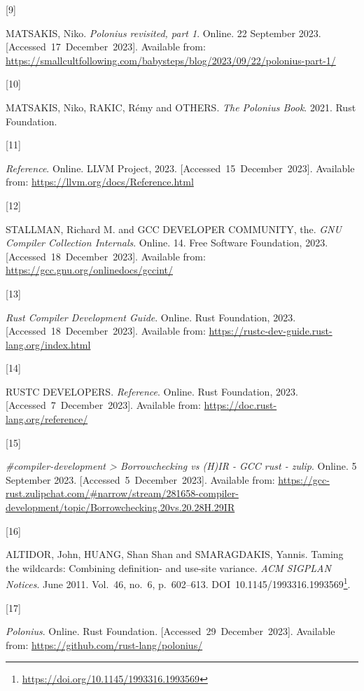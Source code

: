 \documentclass[
  11pt,
  twoside]{report}
\newlength{\cslhangindent}
\newlength{\csllabelwidth}
\newenvironment{CSLReferences}[2] %
 {\begin{list}{}{%
  \setlength{\itemindent}{0pt}
  \setlength{\leftmargin}{0pt}
  \setlength{\parsep}{0pt}
  \ifodd #1
   \setlength{\leftmargin}{\cslhangindent}
   \setlength{\itemindent}{-1\cslhangindent}
  \fi
  \setlength{\itemsep}{#2\baselineskip}}}
 {\end{list}}
\newcommand{\CSLLeftMargin}[1]{\parbox[t]{\csllabelwidth}{\strut#1\strut}}
\newcommand{\CSLRightInline}[1]{\parbox[t]{\linewidth - \csllabelwidth}{\strut#1\strut}}
\DeclareRobustCommand{\href}[2]{#2\footnote{\url{#1}}}
\begin{document}
\begin{CSLReferences}{0}{1}
\CSLLeftMargin{{[}9{]} }%
\CSLRightInline{MATSAKIS, Niko. \emph{Polonius revisited, part 1}.
Online. 22 September 2023. {[}Accessed~17~December~2023{]}. Available
from:
\url{https://smallcultfollowing.com/babysteps/blog/2023/09/22/polonius-part-1/}}

\CSLLeftMargin{{[}10{]} }%
\CSLRightInline{MATSAKIS, Niko, RAKIC, Rémy and OTHERS. \emph{{T}he
{P}olonius {B}ook}. 2021. Rust Foundation. }

\CSLLeftMargin{{[}11{]} }%
\CSLRightInline{\emph{Reference}. Online. LLVM Project, 2023.
{[}Accessed~15~December~2023{]}. Available from:
\url{https://llvm.org/docs/Reference.html}}

\CSLLeftMargin{{[}12{]} }%
\CSLRightInline{STALLMAN, Richard M. and GCC DEVELOPER COMMUNITY, the.
\emph{{GNU} {C}ompiler {C}ollection {I}nternals}. Online. 14. Free
Software Foundation, 2023. {[}Accessed~18~December~2023{]}. Available
from: \url{https://gcc.gnu.org/onlinedocs/gccint/}}

\CSLLeftMargin{{[}13{]} }%
\CSLRightInline{\emph{{R}ust {C}ompiler {D}evelopment {G}uide}. Online.
Rust Foundation, 2023. {[}Accessed~18~December~2023{]}. Available from:
\url{https://rustc-dev-guide.rust-lang.org/index.html}}

\CSLLeftMargin{{[}14{]} }%
\CSLRightInline{RUSTC DEVELOPERS. \emph{Reference}. Online. Rust
Foundation, 2023. {[}Accessed~7~December~2023{]}. Available from:
\url{https://doc.rust-lang.org/reference/}}

\CSLLeftMargin{{[}15{]} }%
\CSLRightInline{\emph{{\#}{c}ompiler-development \textgreater{}
{B}orrowchecking vs ({H})IR - GCC rust - zulip}. Online. 5 September
2023. {[}Accessed~5~December~2023{]}. Available from:
\url{https://gcc-rust.zulipchat.com/\#narrow/stream/281658-compiler-development/topic/Borrowchecking.20vs.20.28H.29IR}}

\CSLLeftMargin{{[}16{]} }%
\CSLRightInline{ALTIDOR, John, HUANG, Shan Shan and SMARAGDAKIS, Yannis.
Taming the wildcards: Combining definition- and use-site variance.
\emph{ACM SIGPLAN Notices}. June 2011. Vol.~46, no.~6, p.~602--613.
DOI~\href{https://doi.org/10.1145/1993316.1993569}{10.1145/1993316.1993569}.
}

\CSLLeftMargin{{[}17{]} }%
\CSLRightInline{\emph{Polonius}. Online. Rust Foundation.
{[}Accessed~29~December~2023{]}. Available from:
\url{https://github.com/rust-lang/polonius/}}


\end{CSLReferences}
\end{document}
